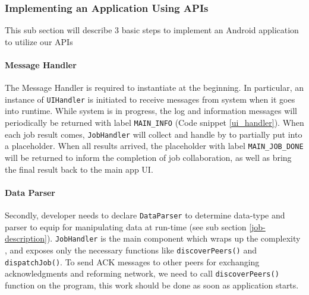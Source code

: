 \documentclass[conference]{IEEEtran}
\begin{document}
\subsubsection{Implementing an Application Using APIs}

This sub section will describe 3 basic steps to implement an Android application to utilize our APIs

\paragraph{Message Handler}

The Message Handler is required to instantiate at the beginning. In particular, an instance of \texttt{UIHandler} is initiated to receive messages from system when it goes into runtime. While system is in progress, the log and information messages will periodically be returned with label \texttt{MAIN\_INFO} (Code snippet \ref{ui_handler}). When each job result comes, \texttt{JobHandler} will collect and handle by  to partially put into a placeholder. When all results arrived, the placeholder with label \texttt{MAIN\_JOB\_DONE} will be returned to inform the completion of job collaboration, as well as bring the final result back to the main app UI.\\

\noindent {}

\paragraph{Data Parser}

Secondly, developer needs to declare \texttt{DataParser} to determine data-type and parser to equip for manipulating data at run-time (see sub section \ref{job-description}). \texttt{JobHandler} is the main component which wraps up the complexity , and exposes only the necessary functions like \texttt{discoverPeers()} and \texttt{dispatchJob()}. To send ACK messages to other peers for exchanging acknowledgments and reforming network, we need to call \texttt{discoverPeers()} function on the program, this work should be done as soon as application starts.\\
\end{document}
